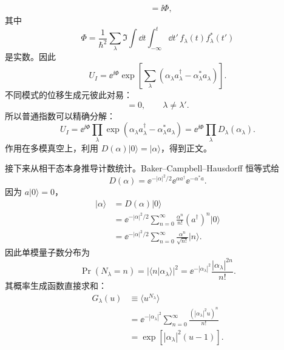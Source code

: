 \begin{derivation}
\begin{align*}
 &=\ii\Phi,
\end{align*}
其中
\begin{equation*}
 \Phi
 =\frac1{\hbar^2}
 \sum_\lambda
 \Im\int\dd t\int_{-\infty}^{t}\dd t'\,
 f_\lambda(t)f_\lambda^*(t')
\end{equation*}
是实数。因此
\begin{equation*}
 U_I
 =\ee^{\ii\Phi}
 \exp\!\left[
 \sum_\lambda
 (\alpha_\lambda a_\lambda^\dagger
 -\alpha_\lambda^*a_\lambda)
 \right].
\end{equation*}
不同模式的位移生成元彼此对易：
\begin{equation*}
 [\alpha_\lambda a_\lambda^\dagger-\alpha_\lambda^*a_\lambda,
 \alpha_{\lambda'}a_{\lambda'}^\dagger-\alpha_{\lambda'}^*a_{\lambda'}]=0,
 \qquad \lambda\neq\lambda'.
\end{equation*}
所以普通指数可以精确分解：
\begin{equation*}
 U_I
 =\ee^{\ii\Phi}\prod_\lambda
 \exp(\alpha_\lambda a_\lambda^\dagger-\alpha_\lambda^*a_\lambda)
 =\ee^{\ii\Phi}\prod_\lambda D_\lambda(\alpha_\lambda).
\end{equation*}
作用在多模真空上，利用 $D(\alpha)|0\rangle=|\alpha\rangle$，得到正文。

接下来从相干态本身推导计数统计。Baker--Campbell--Hausdorff 恒等式给
\begin{equation*}
 D(\alpha)
 =\ee^{-|\alpha|^2/2}
 \ee^{\alpha a^\dagger}\ee^{-\alpha^*a}.
\end{equation*}
因为 $a|0\rangle=0$，
\begin{align*}
 |\alpha\rangle
 &=D(\alpha)|0\rangle\\
 &=\ee^{-|\alpha|^2/2}
 \sum_{n=0}^{\infty}\frac{\alpha^n}{n!}(a^\dagger)^n|0\rangle\\
 &=\ee^{-|\alpha|^2/2}
 \sum_{n=0}^{\infty}\frac{\alpha^n}{\sqrt{n!}}|n\rangle.
\end{align*}
因此单模量子数分布为
\begin{equation*}
 \Pr(N_\lambda=n)
 =|\langle n|\alpha_\lambda\rangle|^2
 =\ee^{-|\alpha_\lambda|^2}
 \frac{|\alpha_\lambda|^{2n}}{n!}.
\end{equation*}
其概率生成函数直接求和：
\begin{align*}
 G_\lambda(u)
 &\equiv\langle u^{N_\lambda}\rangle\\
 &=\ee^{-|\alpha_\lambda|^2}
 \sum_{n=0}^{\infty}
 \frac{(|\alpha_\lambda|^2u)^n}{n!}\\
 &=\exp\!\left[|\alpha_\lambda|^2(u-1)\right].
\end{align*}


\end{derivation}
